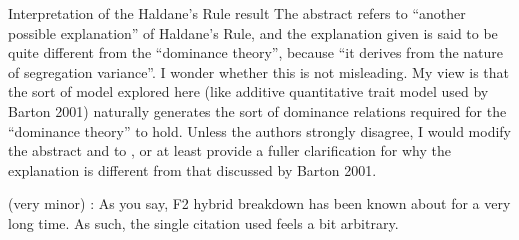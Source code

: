 
\begin{point}{Interpretation of the Haldane’s Rule result}
  The abstract refers to ``another possible explanation'' of Haldane's Rule, and the explanation given is said to be quite different from the ``dominance theory'', because ``it derives from the nature of segregation variance''.  I wonder whether this is not misleading. My view is that the sort of model explored here (like additive quantitative trait model used by Barton 2001) naturally generates the sort of dominance relations required for the ``dominance theory'' to hold. Unless the authors strongly disagree, I would modify the abstract and  to , or at least provide a fuller clarification for why the explanation is different from that discussed by Barton 2001.
\end{point}


\begin{point}{}
  (very minor) : As you say, F2 hybrid breakdown has been known about for a very long time. As such, the single citation used feels a bit arbitrary.
\end{point}



